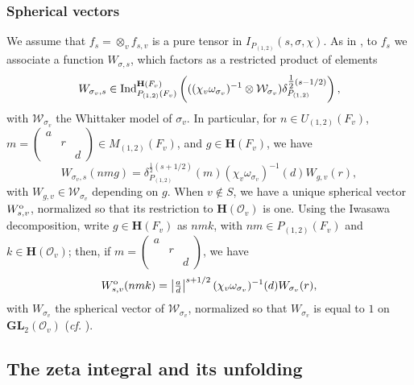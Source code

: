 \documentclass[11pt, reqno]{amsart}
\theoremstyle{plain}
\theoremstyle{definition}
\theoremstyle{remark}
\theoremstyle{plain}
\def\H{{H}}
\def\H{\mathbf{H}}
\def\GL{\mathbf{GL}}
\begin{document}
\subsubsection{Spherical vectors} \label{subsec_Weird_local_whitt}

We assume that $f_s = \otimes_v f_{s,v}$ is a pure tensor in $I_{P_{(1,2)}}(s,\sigma,\chi)$. As in \cite[\S 3.10]{BumpBook}, to $f_s$ we associate  a function $W_{\sigma,s}$, which factors as a restricted product of elements \[W_{\sigma_v,s} \in {\rm Ind}_{P_{(1,2)}(F_v)}^{\H(F_v)}\left(((\chi_v\omega_{\sigma_v})^{-1}\otimes\mathcal{W}_{\sigma_v})\delta_{P_{(1,2)}}^{\tfrac{1}{2}(s-1/2)}\right),\] with $\mathcal{W}_{\sigma_v}$ the Whittaker model of $\sigma_v$. In particular, for $n \in U_{{(1,2)}}(F_v)$, $m = \left(\begin{smallmatrix} a &  &  \\ & r & \\  & & d \end{smallmatrix} \right)  \in M_{(1,2)}(F_v)$, and $g \in \H(F_v)$, we have \[W_{\sigma_v,s}(n m g) = \delta_{P_{(1,2)}}^{\tfrac{1}{2}(s+1/2)}(m) (\chi_v\omega_{\sigma_v})^{-1}(d) W_{g,v}(r),\]
with $W_{g,v} \in \mathcal{W}_{\sigma_v}$ depending on $g$. When $v \not \in S$, we have a unique spherical vector $W_{s,v}^{\rm o}$, normalized so that its restriction to $\H(\mathcal{O}_v)$ is one. Using the Iwasawa decomposition, write $g \in \H(F_v)$ as $n m k$, with $n m \in P_{(1,2)}(F_v)$ and $k \in \H(\mathcal{O}_v)$; then, if $m = \left(\begin{smallmatrix} a &  &  \\ & r & \\  & & d \end{smallmatrix} \right) $, we have
\begin{align}\label{SphericalWhittakerforKES}
    W_{s,v}^{\rm o}(n m k) = \left|\tfrac{a}{d}\right|^{s+1/2} (\chi_v\omega_{\sigma_v})^{-1}(d)W_{\sigma_v}(r), 
\end{align}
with $W_{\sigma_v}$ the spherical vector of $\mathcal{W}_{\sigma_v}$, normalized so that $W_{\sigma_v}$ is equal to $1$ on $\GL_2(\mathcal{O}_v)$ (\textit{cf.} \cite[p. 393]{BumpBook}).

\subsection{The zeta integral and its unfolding}
\end{document}
